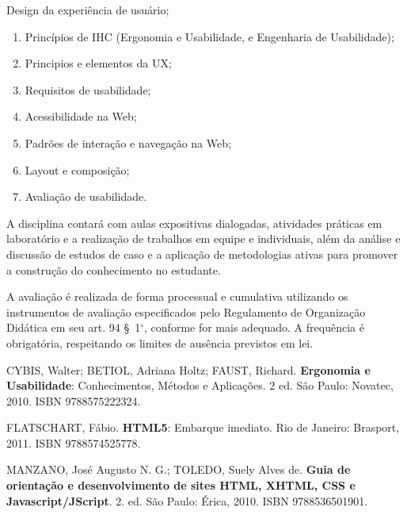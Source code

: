 \begin{pud}
\begin{description}[itemsep=0em]
          \item[UNIDADE VI:]  Design da experiência de usuário;
	         \begin{enumerate}[itemsep=0em, topsep=0em]
  				\item Princípios de IHC (Ergonomia e Usabilidade, e Engenharia de Usabilidade);
				\item Principios e elementos da UX;
				\item Requisitos de usabilidade;
				\item Acessibilidade na Web;
				\item Padrões de interação e navegação na Web;
				\item Layout e composição;
				\item Avaliação de usabilidade.
	        
                
            \end{enumerate}
	\end{description}
	
	
		
	\metodologia	
    A disciplina contará com aulas expositivas dialogadas, atividades práticas em laboratório e a realização de trabalhos em equipe e individuais, além da análise e discussão de estudos de caso e a aplicação de metodologias ativas para promover a construção do conhecimento no estudante.
    

	\avaliacao
	A avaliação é realizada de forma processual e cumulativa utilizando os instrumentos de avaliação especificados pelo Regulamento de Organização Didática em seu art. 94 \S~1$^\circ$, conforme for mais adequado. A frequência é obrigatória, respeitando os limites de ausência previstos em lei.
	\naopresencial
	
	\begin{bibbasica}
		
		\item CYBIS, Walter; BETIOL, Adriana Holtz; FAUST, Richard. \textbf{Ergonomia e Usabilidade}: Conhecimentos, Métodos e Aplicações. 2 ed. São Paulo: Novatec, 2010. ISBN 9788575222324.
	    \item FLATSCHART, Fábio. \textbf{HTML5}: Embarque imediato. Rio de Janeiro: Brasport, 2011.  ISBN 9788574525778.
	    \item MANZANO, José Augusto N. G.; TOLEDO, Suely Alves de. \textbf{Guia de orientação e desenvolvimento de sites HTML, XHTML, CSS e Javascript/JScript}. 2. ed. São Paulo: Érica, 2010. ISBN 9788536501901.

	\end{bibbasica}
	

\end{pud}
